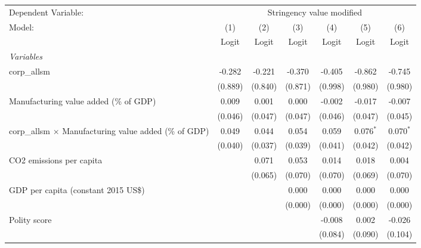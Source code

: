 
\begingroup
\centering
\begin{tabular}{lcccccc}
   \toprule
   Dependent Variable: & \multicolumn{6}{c}{Stringency value modified}\\
   Model:                                                        & (1)     & (2)     & (3)     & (4)     & (5)         & (6)\\  
                                                                 &  Logit  & Logit   & Logit   & Logit   & Logit       & Logit\\  
   \midrule
   \emph{Variables}\\
   corp\_allsm                                                   & -0.282  & -0.221  & -0.370  & -0.405  & -0.862      & -0.745\\   
                                                                 & (0.889) & (0.840) & (0.871) & (0.998) & (0.980)     & (0.980)\\   
   Manufacturing value added (\% of GDP)                         & 0.009   & 0.001   & 0.000   & -0.002  & -0.017      & -0.007\\   
                                                                 & (0.046) & (0.047) & (0.047) & (0.046) & (0.047)     & (0.045)\\   
   corp\_allsm $\times$ Manufacturing value added (\% of GDP)    & 0.049   & 0.044   & 0.054   & 0.059   & 0.076$^{*}$ & 0.070$^{*}$\\   
                                                                 & (0.040) & (0.037) & (0.039) & (0.041) & (0.042)     & (0.042)\\   
   CO2 emissions per capita                                      &         & 0.071   & 0.053   & 0.014   & 0.018       & 0.004\\   
                                                                 &         & (0.065) & (0.070) & (0.070) & (0.069)     & (0.070)\\   
   GDP per capita (constant 2015 US\$)                           &         &         & 0.000   & 0.000   & 0.000       & 0.000\\   
                                                                 &         &         & (0.000) & (0.000) & (0.000)     & (0.000)\\   
   Polity score                                                  &         &         &         & -0.008  & 0.002       & -0.026\\   
                                                                 &         &         &         & (0.084) & (0.090)     & (0.104)\\   

\end{tabular}
